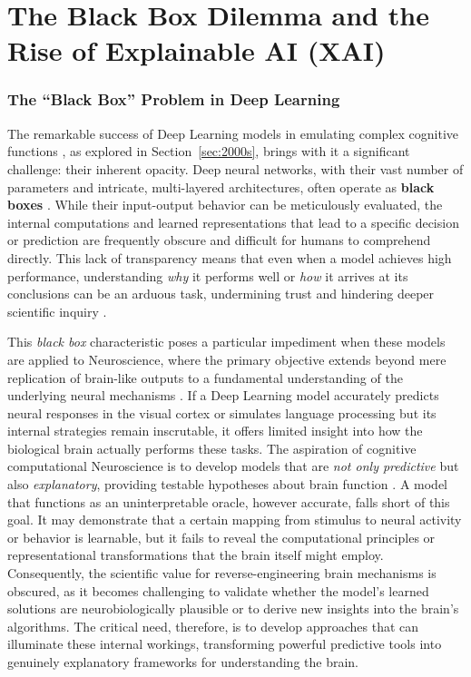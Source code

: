 \part{The Black Box Dilemma and the Rise of Explainable AI (XAI)}

\section{The ``Black Box'' Problem in Deep Learning}

The remarkable success of Deep Learning models in emulating complex cognitive functions \cite{lecun2015deep}, as explored in Section~\ref{sec:2000s}, brings with it a significant challenge: their inherent opacity. Deep neural networks, with their vast number of parameters and intricate, multi-layered architectures, often operate as \textbf{black boxes} \cite{doshi2017towards}. While their input-output behavior can be meticulously evaluated, the internal computations and learned representations that lead to a specific decision or prediction are frequently obscure and difficult for humans to comprehend directly. This lack of transparency means that even when a model achieves high performance, understanding \textit{why} it performs well or \textit{how} it arrives at its conclusions can be an arduous task, undermining trust and hindering deeper scientific inquiry \cite{ribeiro2016why, miller2019explanation}.

This \textit{black box} characteristic poses a particular impediment when these models are applied to Neuroscience, where the primary objective extends beyond mere replication of brain-like outputs to a fundamental understanding of the underlying neural mechanisms \cite{richards2019deep, savage2019how}. If a Deep Learning model accurately predicts neural responses in the visual cortex \cite{yamins2016using} or simulates language processing \cite{caucheteux2022brains} but its internal strategies remain inscrutable, it offers limited insight into how the biological brain actually performs these tasks. The aspiration of cognitive computational Neuroscience is to develop models that are \textit{not only predictive} but also \textit{explanatory}, providing testable hypotheses about brain function \cite{kriegeskorte2018cognitive}. A model that functions as an uninterpretable oracle, however accurate, falls short of this goal. It may demonstrate that a certain mapping from stimulus to neural activity or behavior is learnable, but it fails to reveal the computational principles or representational transformations that the brain itself might employ. Consequently, the scientific value for reverse-engineering brain mechanisms is obscured, as it becomes challenging to validate whether the model's learned solutions are neurobiologically plausible or to derive new insights into the brain's algorithms. The critical need, therefore, is to develop approaches that can illuminate these internal workings, transforming powerful predictive tools into genuinely explanatory frameworks for understanding the brain.

